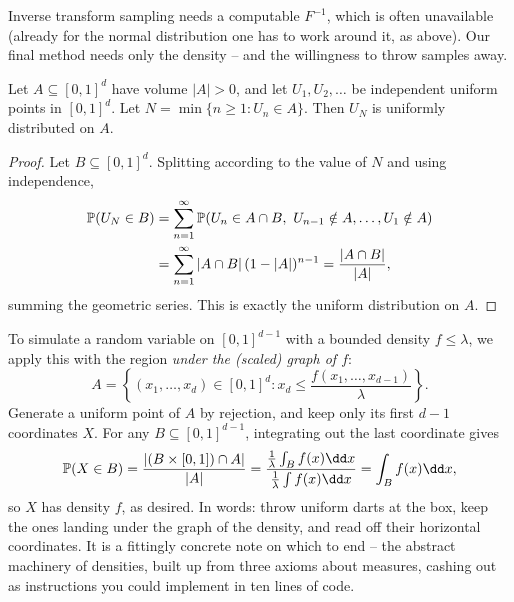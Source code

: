 \documentclass[a4paper]{scrartcl}
\begin{document}
Inverse transform sampling needs a computable $F^{-1}$, which is often unavailable (already for the normal distribution one has to work around it, as above). Our final method needs only the density -- and the willingness to throw samples away.

\begin{theorem}
	Let $A \subseteq [0, 1]^d$ have volume $|A| > 0$, and let $U_1, U_2, \dots$ be independent uniform points in $[0,1]^d$. Let $N = \min\{n \geq 1 : U_n \in A\}$. Then $U_N$ is uniformly distributed on $A$.
\end{theorem}
\begin{proof}
	Let $B \subseteq [0,1]^d$. Splitting according to the value of $N$ and using independence,
	\begin{align*}
		\mathbb{P}(U_N \in B) &= \sum_{n = 1}^{\infty} \mathbb{P}(U_n \in A \cap B,\ U_{n-1} \notin A, \dots, U_1 \notin A) \\
		&= \sum_{n = 1}^{\infty} |A \cap B| \, (1 - |A|)^{n - 1} = \frac{|A \cap B|}{|A|},
	\end{align*}
	summing the geometric series. This is exactly the uniform distribution on $A$.
\end{proof}

To simulate a random variable on $[0,1]^{d-1}$ with a bounded density $f \leq \lambda$, we apply this with the region \emph{under the (scaled) graph of $f$}:
$$
A = \left\{(x_1, \dots, x_d) \in [0,1]^d : x_d \leq \frac{f(x_1, \dots, x_{d-1})}{\lambda}\right\}.
$$
Generate a uniform point of $A$ by rejection, and keep only its first $d - 1$ coordinates $X$. For any $B \subseteq [0,1]^{d - 1}$, integrating out the last coordinate gives
$$
\PP(X \in B) = \frac{|(B \times [0,1]) \cap A|}{|A|} = \frac{\frac{1}{\lambda}\int_B f(x)\dd x}{\frac{1}{\lambda}\int f(x) \dd x} = \int_B f(x)\dd x,
$$
so $X$ has density $f$, as desired. In words: throw uniform darts at the box, keep the ones landing under the graph of the density, and read off their horizontal coordinates. It is a fittingly concrete note on which to end -- the abstract machinery of densities, built up from three axioms about measures, cashing out as instructions you could implement in ten lines of code.
\end{document}
